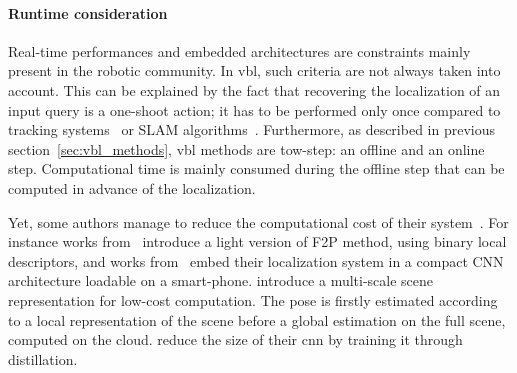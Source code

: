      	\paragraph{Runtime consideration}
	     	\label{para:runtime}
	     	Real-time performances and embedded architectures are constraints mainly present in the robotic community. In \ac{vbl}, such criteria are not always taken into account. This can be explained by the fact that recovering the localization of an input query is a one-shoot action; \ie it has to be performed only once compared to tracking systems~\citep{Marchand2016} or SLAM algorithms~\citep{Garcia-Fidalgo2015}. Furthermore, as described in previous section~\ref{sec:vbl_methods}, \ac{vbl} methods are tow-step: an offline and an online step. Computational time is mainly consumed during the offline step that can be computed in advance of the localization.
	     	
	     	Yet, some authors manage to reduce the computational cost of their system~\citep{Shotton2013,Glocker2015,Lynen2015}. For instance works from~\citep{Feng2016a,Cheng2019} introduce a light version of F2P method, using binary local descriptors, and works from~\citep{Weyand2016,Kendall2015,Contreras2017} embed their localization system in a compact CNN architecture loadable on a smart-phone. \citet{Middelberg2014} introduce a multi-scale scene representation for low-cost computation. The pose is firstly estimated according to a local representation of the scene before a global estimation on the full scene, computed on the cloud. \citet{Sarlin2018a} reduce the size of their \ac{cnn} by training it through distillation.
	    